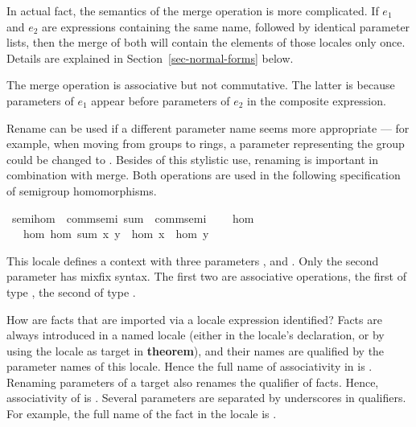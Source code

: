 \begin{isabellebody}
\begin{isamarkuptext}
\begin{description}
  In actual fact, the semantics of the merge operation
  is more complicated.  If $e_1$ and $e_2$ are expressions containing
  the same name, followed by
  identical parameter lists, then the merge of both will contain
  the elements of those locales only once.  Details are explained in
  Section~\ref{sec-normal-forms} below.

  The merge operation is associative but not commutative.  The latter
  is because parameters of $e_1$ appear
  before parameters of $e_2$ in the composite expression.
\end{description}

  Rename can be used if a different parameter name seems more
  appropriate --- for example, when moving from groups to rings, a
  parameter  representing the group could be changed to
  .  Besides of this stylistic use, renaming is important in
  combination with merge.  Both operations are used in the following
  specification of semigroup homomorphisms.%
\end{isamarkuptext}%
\isamarkuptrue%
\ semi{\isacharunderscore}hom\ {\isacharequal}\ comm{\isacharunderscore}semi\ sum\ {\isacharplus}\ comm{\isacharunderscore}semi\ {\isacharplus}\isanewline
\ \ \ hom\isanewline
\ \ \ hom{\isacharcolon}\ {\isachardoublequote}hom\ {\isacharparenleft}sum\ x\ y{\isacharparenright}\ {\isacharequal}\ hom\ x\ {\isasymcdot}\ hom\ y{\isachardoublequote}\isamarkupfalse%
%
\begin{isamarkuptext}%
This locale defines a context with three parameters ,
   and .  Only the second parameter has
  mixfix syntax.  The first two are associative operations,
  the first of type , the second of
  type .  

  How are facts that are imported via a locale expression identified?
  Facts are always introduced in a named locale (either in the
  locale's declaration, or by using the locale as target in
  \textbf{theorem}), and their names are
  qualified by the parameter names of this locale.
  Hence the full name of associativity in  is
  .  Renaming parameters of a target also renames
  the qualifier of facts.  Hence, associativity of  is
  .  Several parameters are separated by
  underscores in qualifiers.  For example, the full name of the fact
   in the locale  is .


\end{isamarkuptext}
\end{isabellebody}
